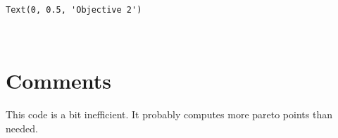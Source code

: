             \begin{tcolorbox}[breakable, size=fbox, boxrule=.5pt, pad at break*=1mm, opacityfill=0]
\begin{Verbatim}[commandchars=\\\{\}]
Text(0, 0.5, 'Objective 2')
\end{Verbatim}
\end{tcolorbox}
        
    \begin{center}
    \end{center}
    { \hspace*{\fill} \\}
    
    \hypertarget{comments}{%
\section{Comments}\label{comments}}

This code is a bit inefficient. It probably computes more pareto points
than needed.



